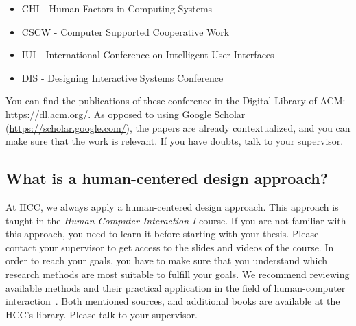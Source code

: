 \begin{itemize}
    \itemsep0em %
    \item CHI - Human Factors in Computing Systems
    \item CSCW - Computer Supported Cooperative Work
    \item IUI - International Conference on Intelligent User Interfaces
    \item DIS - Designing Interactive Systems Conference
\end{itemize}

You can find the publications of these conference in the Digital Library of ACM: \url{https://dl.acm.org/}. As opposed to using Google Scholar (\url{https://scholar.google.com/}), the papers are already contextualized, and you can make sure that the work is relevant. If you have doubts, talk to your supervisor.

\subsection*{What is a human-centered design approach?}
At HCC, we always apply a human-centered design approach. This approach is taught in the \emph{Human-Computer Interaction I} course. If you are not familiar with this approach, you need to learn it before starting with your thesis. Please contact your supervisor to get access to the slides and videos of the course. In order to reach your goals, you have to make sure that you understand which research methods are most suitable to fulfill your goals. We recommend reviewing available methods and their practical application in the field of human-computer interaction~\cite{lazar2017research, olson2014ways}. Both mentioned sources, and additional books are available at the HCC's library. Please talk to your supervisor.

\afterpage{\nopagecolor}